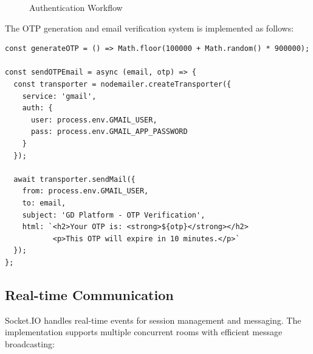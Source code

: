 \documentclass[conference]{IEEEtran}
\begin{document}
\begin{figure}[H]
\centering
{}
\caption{Authentication Workflow}
\label{fig:auth_workflow}
\end{figure}

The OTP generation and email verification system is implemented as follows:

\begin{lstlisting}[caption=OTP Generation and Email Sending, label=lst:otp]
const generateOTP = () => Math.floor(100000 + Math.random() * 900000);

const sendOTPEmail = async (email, otp) => {
  const transporter = nodemailer.createTransporter({
    service: 'gmail',
    auth: { 
      user: process.env.GMAIL_USER, 
      pass: process.env.GMAIL_APP_PASSWORD 
    }
  });
  
  await transporter.sendMail({
    from: process.env.GMAIL_USER,
    to: email,
    subject: 'GD Platform - OTP Verification',
    html: `<h2>Your OTP is: <strong>${otp}</strong></h2>
           <p>This OTP will expire in 10 minutes.</p>`
  });
};
\end{lstlisting}

\subsection{Real-time Communication}

Socket.IO handles real-time events for session management and messaging. The implementation supports multiple concurrent rooms with efficient message broadcasting:
\end{document}
